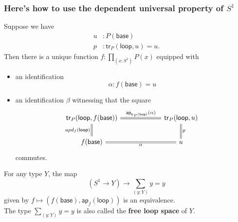 \documentclass[handout]{beamer}
\newcommand{\sphere}[1]{S^{#1}}
\newcommand{\ap}{\mathsf{ap}}
\newcommand{\baseS}{\mathsf{base}}
\newcommand{\loopS}{\mathsf{loop}}
\newcommand{\tr}{\mathsf{tr}}
\newcommand{\apply}[2]{#1(#2)}
\begin{document}
\begin{frame}
  \frametitle{Here's how to use the dependent universal property of $\sphere{1}$}
  Suppose we have
  \begin{align*}
    u & : \apply{P}{\baseS} \\
    p & : \apply{\tr_P}{\loopS,u}=u.
  \end{align*}
  Then there is a unique function $f:\prod_{(x:\sphere{1})}\apply{P}{x}$ equipped with\pause
  \begin{itemize}
  \item an identification
    \begin{equation*}
      \alpha : \apply{f}{\baseS} = u
    \end{equation*}\pause
  \item an identification $\beta$ witnessing that the square
    \begin{equation*}
      \begin{tikzcd}[ampersand replacement=\&,column sep=6em]
        \apply{\tr_P}{\loopS,\apply{f}{\baseS}} \arrow[d,equals,swap,"\apply{apd_f}{\loopS}"] \arrow[r,equals,"\apply{\ap_{\apply{\tr_P}{\loopS}}}{\alpha}"] \& \apply{\tr_P}{\loopS,u} \arrow[d,equals,"p"] \\
        \apply{f}{\baseS} \arrow[r,equals,swap,"\alpha"] \& u
      \end{tikzcd}
    \end{equation*}
    commutes.
  \end{itemize}
\end{frame}

\begin{frame}
  \begin{theorem}
    For any type $Y$, the map
    \begin{equation*}
      (\sphere{1}\to Y)\to \sum_{(y:Y)}y=y
    \end{equation*}
    given by $f\mapsto (\apply{f}{\baseS},\apply{\ap_f}{\loopS})$ is an equivalence.\\[1em]

    The type $\sum_{(y:Y)}y=y$ is also called the \textbf{free loop space} of $Y$.
  \end{theorem}
\end{frame}
\end{document}
